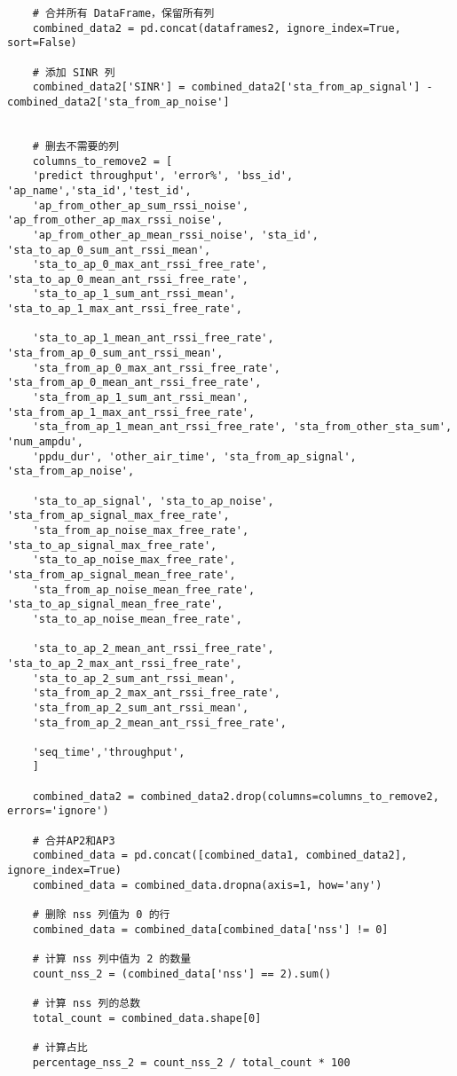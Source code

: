 \documentclass[bwprint,fontset=windows]{gmcmthesis}
\begin{document}
\begin{lstlisting}
	# 合并所有 DataFrame，保留所有列
	combined_data2 = pd.concat(dataframes2, ignore_index=True, sort=False)
	
	# 添加 SINR 列
	combined_data2['SINR'] = combined_data2['sta_from_ap_signal'] - combined_data2['sta_from_ap_noise']
	
	
	# 删去不需要的列
	columns_to_remove2 = [
	'predict throughput', 'error%', 'bss_id', 'ap_name','sta_id','test_id',
	'ap_from_other_ap_sum_rssi_noise', 'ap_from_other_ap_max_rssi_noise',
	'ap_from_other_ap_mean_rssi_noise', 'sta_id', 'sta_to_ap_0_sum_ant_rssi_mean',
	'sta_to_ap_0_max_ant_rssi_free_rate', 'sta_to_ap_0_mean_ant_rssi_free_rate',
	'sta_to_ap_1_sum_ant_rssi_mean', 'sta_to_ap_1_max_ant_rssi_free_rate',
	
	'sta_to_ap_1_mean_ant_rssi_free_rate', 'sta_from_ap_0_sum_ant_rssi_mean',
	'sta_from_ap_0_max_ant_rssi_free_rate', 'sta_from_ap_0_mean_ant_rssi_free_rate',
	'sta_from_ap_1_sum_ant_rssi_mean', 'sta_from_ap_1_max_ant_rssi_free_rate',
	'sta_from_ap_1_mean_ant_rssi_free_rate', 'sta_from_other_sta_sum', 'num_ampdu',
	'ppdu_dur', 'other_air_time', 'sta_from_ap_signal', 'sta_from_ap_noise',
	
	'sta_to_ap_signal', 'sta_to_ap_noise', 'sta_from_ap_signal_max_free_rate',
	'sta_from_ap_noise_max_free_rate', 'sta_to_ap_signal_max_free_rate',
	'sta_to_ap_noise_max_free_rate', 'sta_from_ap_signal_mean_free_rate',
	'sta_from_ap_noise_mean_free_rate', 'sta_to_ap_signal_mean_free_rate',
	'sta_to_ap_noise_mean_free_rate',
	
	'sta_to_ap_2_mean_ant_rssi_free_rate', 'sta_to_ap_2_max_ant_rssi_free_rate',
	'sta_to_ap_2_sum_ant_rssi_mean',           
	'sta_from_ap_2_max_ant_rssi_free_rate',    
	'sta_from_ap_2_sum_ant_rssi_mean',         
	'sta_from_ap_2_mean_ant_rssi_free_rate',
	
	'seq_time','throughput',
	]
	
	combined_data2 = combined_data2.drop(columns=columns_to_remove2, errors='ignore')
	
	# 合并AP2和AP3
	combined_data = pd.concat([combined_data1, combined_data2], ignore_index=True)
	combined_data = combined_data.dropna(axis=1, how='any')
	
	# 删除 nss 列值为 0 的行
	combined_data = combined_data[combined_data['nss'] != 0]
	
	# 计算 nss 列中值为 2 的数量
	count_nss_2 = (combined_data['nss'] == 2).sum()
	
	# 计算 nss 列的总数
	total_count = combined_data.shape[0]
	
	# 计算占比
	percentage_nss_2 = count_nss_2 / total_count * 100
	

\end{lstlisting}
\end{document}
